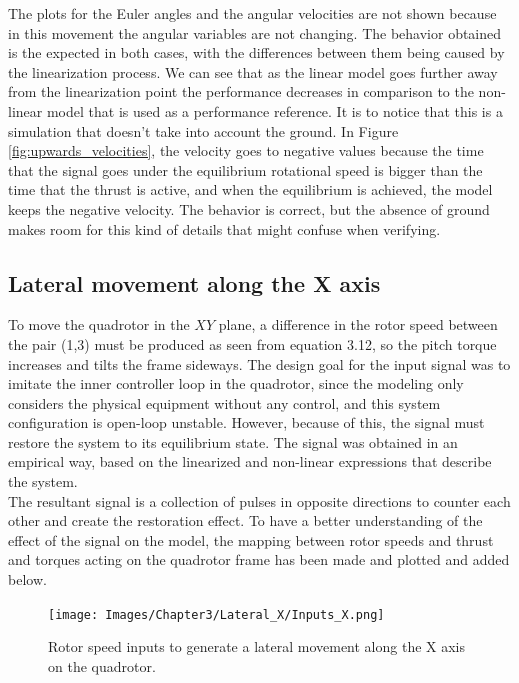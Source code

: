 The plots for the Euler angles and the angular velocities are not shown because in this movement the angular variables are not changing. The behavior obtained is the expected in both cases, with the differences between them being caused by the linearization process. We can see that as the linear model goes further away from the linearization point the performance decreases in comparison to the non-linear model that is used as a performance reference. It is to notice that this is a simulation that doesn't take into account the ground. In Figure \ref{fig:upwards_velocities}, the velocity goes to negative values because the time that the signal goes under the equilibrium rotational speed is bigger than the time that the thrust is active, and when the equilibrium is achieved, the model keeps the negative velocity. The behavior is correct, but the absence of ground makes room for this kind of details that might confuse when verifying. 

\subsection{Lateral movement along the X axis}

To move the quadrotor in the $XY$ plane, a difference in the rotor speed between the pair (1,3) must be produced as seen from equation 3.12, so the pitch torque increases and tilts the frame sideways. The design goal for the input signal was to imitate the inner controller loop in the quadrotor, since the modeling only considers the physical equipment without any control, and this system configuration is open-loop unstable. However, because of this, the signal must restore the system to its equilibrium state. The signal was obtained in an empirical way, based on the linearized and non-linear expressions that describe the system. \\

The resultant signal is a collection of pulses in opposite directions to counter each other and create the restoration effect. To have a better understanding of the effect of the signal on the model, the mapping between rotor speeds and thrust and torques acting on the quadrotor frame has been made and plotted and added below.

\begin{figure}[h!]
\centering
\texttt{[image: Images/Chapter3/Lateral\_X/Inputs\_X.png]}
\caption{Rotor speed inputs to generate a lateral movement along the X axis on the quadrotor.}
\label{fig:lateralX_inputs}
\end{figure}

